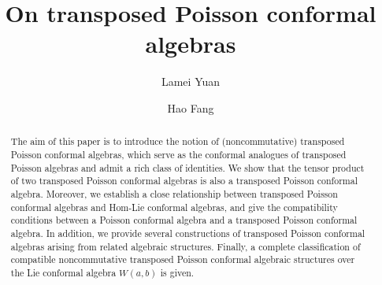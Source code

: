 \documentclass[11pt,letterpaper,reqno]{amsart}
\theoremstyle{definition}
\numberwithin{equation}{section}
\begin{document}
\title{On transposed Poisson conformal algebras}

\author{Lamei Yuan}
\address{Lamei Yuan (corresponding author), School of Mathematics, Harbin Institute of Technology, Harbin 150001, People's Republic of China}

\author{Hao Fang}
\address{Hao Fang, School of Mathematics, Harbin Institute of Technology, Harbin 150001, People's Republic of China}




\begin{abstract}
The aim of this paper is to introduce the notion of (noncommutative) transposed Poisson conformal algebras, which serve as the conformal analogues of transposed Poisson algebras
and admit a rich class of identities.  We show that the tensor product of two transposed Poisson conformal algebras is also a transposed Poisson conformal algebra.
Moreover, we establish a close relationship between transposed Poisson conformal algebras and Hom-Lie conformal algebras, and give the compatibility conditions between a Poisson conformal algebra and a transposed Poisson conformal algebra.
In addition, we provide several constructions of transposed Poisson conformal algebras arising from related algebraic structures.
Finally, a complete classification of compatible noncommutative transposed Poisson conformal algebraic structures over the Lie conformal algebra $W(a,b)$ is given.
\end{abstract}

\maketitle


\end{document}
